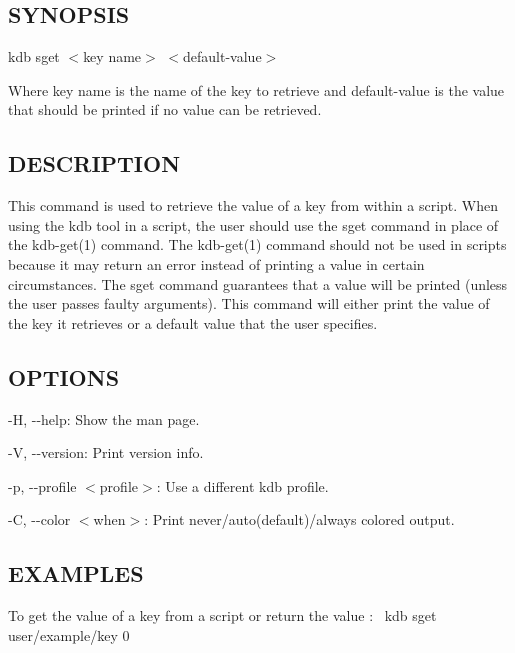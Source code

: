 \subsection*{S\+Y\+N\+O\+P\+S\+IS}

{\ttfamily kdb sget $<$key name$>$ $<$default-\/value$>$}

Where {\ttfamily key name} is the name of the key to retrieve and {\ttfamily default-\/value} is the value that should be printed if no value can be retrieved.

\subsection*{D\+E\+S\+C\+R\+I\+P\+T\+I\+ON}

This command is used to retrieve the value of a key from within a script. When using the kdb tool in a script, the user should use the {\ttfamily sget} command in place of the kdb-\/get(1) command. The kdb-\/get(1) command should not be used in scripts because it may return an error instead of printing a value in certain circumstances. The {\ttfamily sget} command guarantees that a value will be printed (unless the user passes faulty arguments). This command will either print the value of the key it retrieves or a default value that the user specifies.

\subsection*{O\+P\+T\+I\+O\+NS}


\begin{DoxyItemize}
\item {\ttfamily -\/H}, {\ttfamily -\/-\/help}\+: Show the man page.
\item {\ttfamily -\/V}, {\ttfamily -\/-\/version}\+: Print version info.
\item {\ttfamily -\/p}, {\ttfamily -\/-\/profile $<$profile$>$}\+: Use a different kdb profile.
\item {\ttfamily -\/C}, {\ttfamily -\/-\/color $<$when$>$}\+: Print never/auto(default)/always colored output.
\end{DoxyItemize}

\subsection*{E\+X\+A\+M\+P\+L\+ES}

To get the value of a key from a script or return the value {}\+:~\newline
 {\ttfamily kdb sget user/example/key 0}

